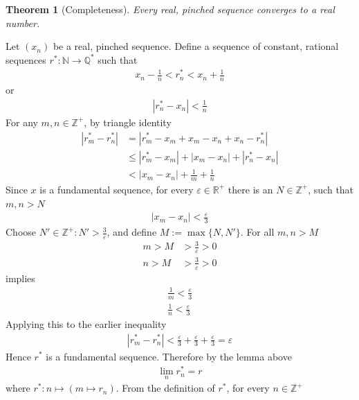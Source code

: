 \documentclass{amsart}
\numberwithin{equation}{section}
\let\oldendproof\endproof
\renewenvironment{proof}[1][\proofname]{%
  \setcounter{case}{0}
  \setcounter{step}{0}
  \oldproof[#1]%
}{\oldendproof}
\theoremstyle{plain}
\newtheorem{theorem}{Theorem}[section]
\theoremstyle{definition}
\theoremstyle{remark}
\begin{document}
\begin{theorem}[Completeness]
  Every real, pinched sequence converges to a real number.
\end{theorem}
\begin{proof}
  Let $(x_n)$ be a real, pinched sequence. Define a sequence of constant, rational sequences $r^*:\mathbb{N}\to\mathbb{Q}^*$ such that
  \begin{align}
    x_n-\frac{1}{n} < r_n^* < x_n+\frac{1}{n}
  \end{align}
  or
  \begin{align}
    |r_n^*-x_n | < \frac{1}{n}
  \end{align}
  For any $m,n\in\mathbb{Z}^+$, by triangle identity
  \begin{align}
    |r^*_m - r^*_n | &= |r^*_m - x_m + x_m - x_n +x_n - r^*_n|\\
    &\leq |r_m^* - x_m| + |x_m - x_n| + |r_n^* - x_n|\\
    &< |x_m - x_n| + \frac{1}{m} + \frac{1}{n}
  \end{align}
  Since $x$ is a fundamental sequence, for every $\varepsilon\in\mathbb{R}^+$ there is an $N\in\mathbb{Z}^+$, such that $m,n>N$
  \begin{align}
    |x_m - x_n | < \frac{\varepsilon}{3}
  \end{align}
  Choose $N'\in\mathbb{Z}^+:N'>\frac{3}{\varepsilon}$, and define $M:=\max\{ N , N'\}$. For all $m, n > M $
  \begin{align}
    m > M &> \frac{3}{\varepsilon} > 0\nonumber\\
    n > M &> \frac{3}{\varepsilon} > 0
  \end{align}
  implies
  \begin{align}
    \frac{1}{m} < \frac{\varepsilon}{3}\nonumber\\
    \frac{1}{n} < \frac{\varepsilon}{3}
  \end{align}
  Applying this to the earlier inequality
  \begin{align}
    |r^*_m - r^*_n| < \frac{\varepsilon}{3} + \frac{\varepsilon}{3} + \frac{\varepsilon}{3} = \varepsilon
  \end{align}
  Hence $r^*$ is a fundamental sequence.
  Therefore by the lemma above
  \begin{align}
    \lim_n r^*_n = r
  \end{align}
  where $r^*: n \mapsto ( m \mapsto r_n)$. 
  From the definition of $r^*$, for every $n\in\mathbb{Z}^+$
  \begin{align}

\end{align}
\end{proof}
\end{document}

